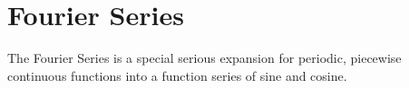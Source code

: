 \documentclass[./\jobname.tex]{subfiles}
\begin{document}
\chapter{Fourier Series}

The Fourier Series is a special serious expansion for periodic, piecewise continuous functions into a function series of sine and cosine.
\end{document}
